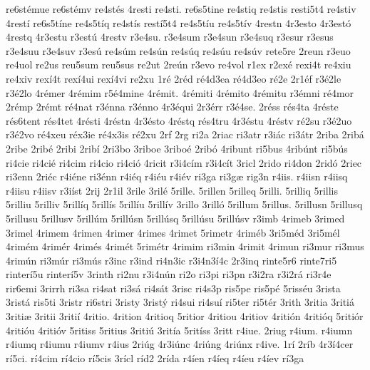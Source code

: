 {re6st^^e9mue
re6st^^e9mv
re4st^^e9s
4resti
re4sti.
re6s5tine
re4stiq
re4stis
resti5t4
re4stiv
4rest^^ed
re6s5t^^edne
re4s5t^^edq
re4st^^eds
rest^^ed5t4
re4s5t^^edu
re4s5t^^edv
4restn
4r3esto
4r3est^^f3
4restq
4r3estu
r3est^^fa
4restv
r3e4su.
r3e4sum
r3e4sun
r3e4suq
r3esur
r3esus
r3e4suu
r3e4suv
r3es^^fa
re4s^^fam
re4s^^fan
re4s^^faq
re4s^^fau
re4s^^fav
rete5re
2reun
r3euo
re4uol
re2us
reu5sum
reu5sus
re2ut
2re^^fan
r3evo
re4vol
r1ex
r2ex^^e9
rexi4t
re4xiu
re4xiv
rex^^ed4t
rex^^ed4ui
rex^^ed4vi
re2xu
1r^^e9
2r^^e9d
r^^e94d3ea
r^^e94d3eo
r^^e92e
2r1^^e9f
r3^^e92le
r3^^e92lo
4r^^e9mer
4r^^e9mim
r5^^e94mine
4r^^e9mit.
4r^^e9miti
4r^^e9mito
4r^^e9mitu
r3^^e9mni
r^^e94mor
2r^^e9mp
2r^^e9mt
r^^e94nat
r3^^e9nna
r3^^e9nno
4r3^^e9qui
2r3^^e9rr
r3^^e94se.
2r^^e9ss
r^^e9s4ta
4r^^e9ste
r^^e9s6tent
r^^e9s4tet
4r^^e9sti
4r^^e9stn
4r3^^e9sto
4r^^e9stq
r^^e9s4tru
4r3^^e9stu
4r^^e9stv
r^^e92su
r3^^e92uo
r3^^e92vo
r^^e94xeu
r^^e9x3ie
r^^e94x3is
r^^e92xu
2rf
2rg
ri2a
2riac
ri3atr
r3i^^e1c
ri3^^e1tr
2riba
2rib^^e1
2ribe
2rib^^e9
2ribi
2rib^^ed
2ri3bo
3riboe
3ribo^^e9
2rib^^f3
4ribunt
ri5bus
4rib^^fant
ri5b^^fas
ri4cie
ri4ci^^e9
ri4cim
ri4cio
ri4ci^^f3
4ricit
r3i4c^^edm
r3i4c^^edt
3ricl
2rido
ri4don
2rid^^f3
2riec
ri3enn
2ri^^e9c
r4i^^e9ne
ri3^^e9nn
r4i^^e9q
r4i^^e9u
r4i^^e9v
ri3ga
ri3g^^e6
rig3n
r4iis.
r4iisn
r4iisq
r4iisu
r4iisv
r3i^^edst
2rij
2r1il
3rile
3ril^^e9
5rille.
5rillen
5rilleq
5rilli.
5rilliq
5rillis
5rilliu
5rilliv
5rill^^edq
5rill^^eds
5rill^^edu
5rill^^edv
3rillo
3rill^^f3
5rillum
5rillus.
5rillusn
5rillusq
5rillusu
5rillusv
5rill^^fam
5rill^^fasn
5rill^^fasq
5rill^^fasu
5rill^^fasv
r3imb
4rimeb
3rimed
3rimel
4rimem
4rimen
4rimer
4rimes
4rimet
5rimetr
4rim^^e9b
3ri5m^^e9d
3ri5m^^e9l
4rim^^e9m
4rim^^e9r
4rim^^e9s
4rim^^e9t
5rim^^e9tr
4rimim
ri3min
4rimit
4rimun
ri3mur
ri3mus
4rim^^fan
ri3m^^far
ri3m^^fas
r3inc
r3ind
ri4n3ic
r3i4n3^^ed4c
2r3inq
rinte5r6
rinte7ri5
rinter^^ed5u
rinter^^ed5v
3rinth
ri2nu
r3i4n^^fan
ri2o
ri3pi
ri3pn
r3i2ra
r3i2r^^e1
ri3r4e
rir6emi
3rirrh
ri3sa
ri4sat
ri3s^^e1
ri4s^^e1t
3risc
ri4s3p
ris5pe
ris5p^^e9
5riss^^e9u
3rista
3rist^^e1
ris5ti
3ristr
ri6stri
3risty
3rist^^fd
ri4sui
ri4su^^ed
ri5ter
ri5t^^e9r
3rith
3ritia
3riti^^e1
3riti^^e6
3ritii
3riti^^ed
4ritio.
4rition
4ritioq
5ritior
4ritiou
4ritiov
4riti^^f3n
4riti^^f3q
5riti^^f3r
4riti^^f3u
4riti^^f3v
5ritiss
5ritius
3riti^^fa
3rit^^eda
5rit^^edss
3ritt
r4iue.
2riug
r4ium.
r4iumn
r4iumq
r4iumu
r4iumv
r4ius
2ri^^fag
4r3i^^fanc
4ri^^fang
4ri^^fanx
r4ive.
1r^^ed
2r^^edb
4r3^^ed4cer
r^^ed5ci.
r^^ed4cim
r^^ed4cio
r^^ed5cis
3r^^edcl
r^^edd2
2r^^edda
r4^^eden
r4^^edeq
r4^^edeu
r4^^edev
r^^ed3ga
}
